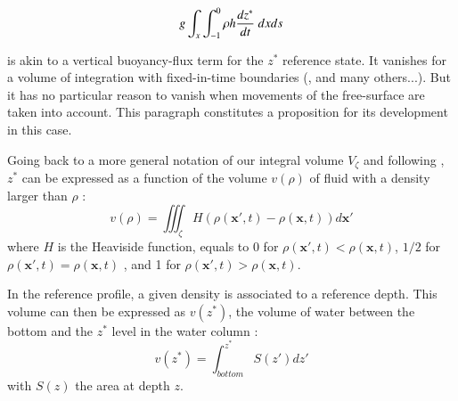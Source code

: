 \begin{equation}
\label{RHS_BPE_1}
g\int_{x} \int_{-1}^0 \rho h \frac{d z^*}{d t}\ dx ds \\
\end{equation}

is akin to a vertical buoyancy-flux term for the $z^*$ reference state. It vanishes for a volume of integration with fixed-in-time boundaries (\cite{winters_available_1995}, \cite{huang_mixing_1998} and many others...). But it has no particular reason to vanish when movements of the free-surface are taken into account. This paragraph constitutes a proposition for its development in this case.

Going back to a more general notation of our integral volume $V_{\zeta}$ and following \citet{huang_mixing_1998}, $z^*$ can be expressed as a function of the volume $v(\rho)$ of fluid with a density larger than $\rho$ :
\begin{equation}
v(\rho)=\iiint_{\zeta} H(\rho(\mathbf{x}',t)-\rho(\mathbf{x},t))d\mathbf{x}' %
\end{equation}
where $H$ is the Heaviside function, equals to 0 for $\rho(\mathbf{x}',t)<\rho(\mathbf{x},t)$, $1/2$ for $\rho(\mathbf{x}',t)=\rho(\mathbf{x},t)$ , and 1 for $\rho(\mathbf{x}',t)>\rho(\mathbf{x},t)$.

In the reference profile, a given density is associated to a reference depth. This volume can then be expressed as $v(z^*)$, the volume of water between the bottom and the $z^*$ level in the water column :
\begin{equation}
v(z^*)=\int^{z^*}_{bottom} S(z')dz'
\end{equation}
with $S(z)$ the area at depth $z$.


